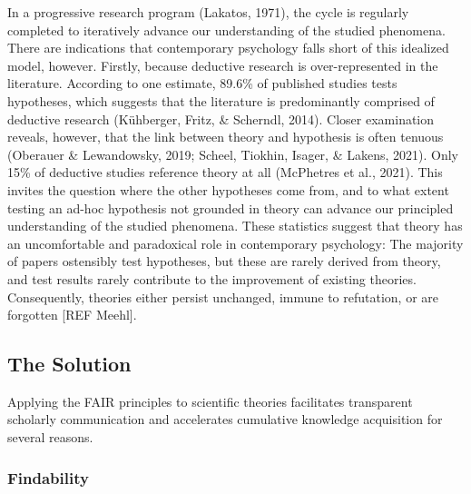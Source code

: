 \documentclass[
  man]{apa6}
\begin{document}
In a progressive research program (Lakatos, 1971),
the cycle is regularly completed to iteratively advance our understanding of the studied phenomena.
There are indications that contemporary psychology falls short of this idealized model, however.
Firstly, because deductive research is over-represented in the literature.
According to one estimate, 89.6\% of published studies tests hypotheses,
which suggests that the literature is predominantly comprised of deductive research (Kühberger, Fritz, \& Scherndl, 2014).
Closer examination reveals, however, that the link between theory and hypothesis is often tenuous (Oberauer \& Lewandowsky, 2019; Scheel, Tiokhin, Isager, \& Lakens, 2021).
Only 15\% of deductive studies reference theory at all (McPhetres et al., 2021).
This invites the question where the other hypotheses come from,
and to what extent testing an ad-hoc hypothesis not grounded in theory can advance our principled understanding of the studied phenomena.
These statistics suggest that theory has an uncomfortable and paradoxical role in contemporary psychology:
The majority of papers ostensibly test hypotheses,
but these are rarely derived from theory,
and test results rarely contribute to the improvement of existing theories.
Consequently, theories either persist unchanged, immune to refutation,
or are forgotten {[}REF Meehl{]}.

\subsection{The Solution}\label{the-solution}

Applying the FAIR principles to scientific theories facilitates transparent scholarly communication and accelerates cumulative knowledge acquisition for several reasons.

\subsubsection{Findability}\label{findability}
\end{document}
